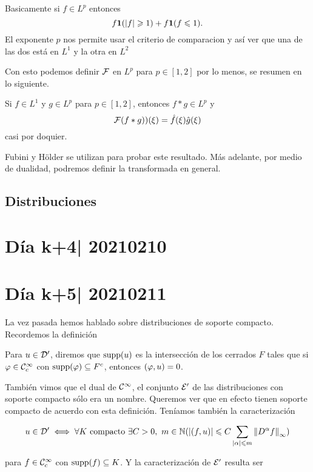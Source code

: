 \documentclass[12pt]{memoir}
\begin{document}
\begin{ptcbp}
  Basicamente si $f\in L^p$ entonces
  $$f\mathbf{1}(|f|\geqslant 1)+f\mathbf{1}(f\leqslant 1).$$
  El exponente $p$ nos permite usar el criterio de comparacion y así ver que una de las dos está en $L^1$ y la otra en $L^2$
\end{ptcbp}

Con esto podemos definir $\mathcal{F}$ en $L^p$ para $p\in [1,2]$ por lo menos, se resumen en lo siguiente. 

\begin{Th}
  Si $f\in L^1$ y $g\in L^p$ para $p\in[1,2]$, entonces $f\ast g\in L^p$ y 
  $$\mathcal{F}(f\ast g))(\xi)=\hat{f}(\xi)\hat{g}(\xi)$$
  casi por doquier.
\end{Th}

Fubini y Hölder se utilizan para probar este resultado. Más adelante, por medio de dualidad, podremos definir la transformada en general.

\subsection{Distribuciones}
\section{Día k+4| 20210210}
\section{Día k+5| 20210211}

La vez pasada hemos hablado sobre distribuciones de soporte compacto. Recordemos la definición 

\begin{Def}
  Para $u\in\mathcal{D}'$, diremos que $\operatorname{supp}(u)$ es la intersección de los cerrados $F$ tales que si $\varphi\in\mathcal{C}^\infty_c$ con $\operatorname{supp}(\varphi)\subseteq F^c$, entonces $(\varphi,u)=0$. %
\end{Def}

También vimos que el dual de $\mathcal{C}^\infty$, el conjunto $\mathcal{E}'$ de las distribuciones con soporte compacto sólo era un nombre. Queremos ver que en efecto tienen soporte compacto de acuerdo con esta definición. Teníamos también la caracterización

$$u\in\cD'\iff \forall K\ \text{compacto}\ \exists C>0,\ m\in\bN(|(f,u)|\leq C\sum_{|\al|\leq m}\nm{D^\al f}_\infty)$$

para $f\in\mathcal{C}^\infty_c$ con $\operatorname{supp}(f)\subseteq K$. Y la caracterización de $\mathcal{E}'$ resulta ser 
\end{document}
